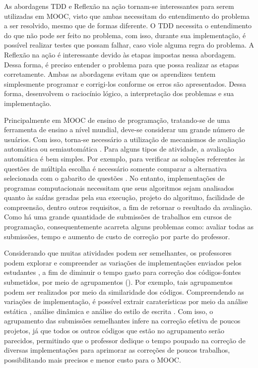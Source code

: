 	As abordagens \acl{TDD} e Reflexão na ação tornam-se interessantes para serem
	utilizadas em \acl{MOOC}, visto que ambas necessitam do entendimento do problema
	a ser resolvido, mesmo que de formas diferente. O \acl{TDD} necessita o entendimento
	do que não pode ser feito no problema, com isso, durante sua implementação, é
	possível realizar testes que possam falhar, caso viole alguma regra do problema.
	A Reflexão na ação é interessante devido às etapas impostas nessa abordagem.
	Dessa forma, é preciso entender o problema para que possa realizar as etapas
	corretamente. Ambas as abordagens evitam que os aprendizes tentem simplesmente
	programar e corrigi-los conforme os erros são apresentados. Dessa forma, desenvolvem
	o raciocínio lógico, a interpretação dos problemas e sua implementação.
	
	Principalmente em \acs{MOOC} de ensino de programação, tratando-se de uma ferramenta de
	ensino a nível mundial, deve-se considerar um grande número de usuários. Com isso,
	torna-se necessário a utilização de mecanismos de avaliação automática ou
	semiautomática \cite{schmidt2013producing}. Para alguns tipos de atividade, a
	avaliação automática é bem simples. Por exemplo, para verificar as soluções
	referentes às questões de múltipla escolha é necessário somente comparar a
	alternativa selecionada com o gabarito de questões \cite{alario2013analysing}. No
	entanto, implementações de programas computacionais necessitam que seus algoritmos
	sejam analisados quanto às saídas geradas pela sua execução, projeto do algoritmo,
	facilidade de compreensão, dentro outros requisitos, a fim de retornar o resultado
	da avaliação. Como há uma grande quantidade de submissões de trabalhos em cursos
	de programação, consequentemente acarreta alguns problemas como: avaliar todas as
	submissões, tempo e aumento de custo de correção por parte do professor.
	
	
	
	Considerando que muitas atividades podem ser semelhantes, os professores podem explorar
	e compreender as variações de implementações enviados pelos estudantes \cite{Yin:2015}, a fim de diminuir
	o tempo gasto para correção dos códigos-fontes submetidos, por meio de agrupamentos
	(). Por exemplo, tais agrupamentos podem ser realizados por meio
	da similaridade dos códigos. Compreendendo as variações de implementação, é possível
	extrair caraterísticas por meio da análise estática \cite{Yin:2015,Glassman:2014,Taherkhani:2012},
	análise dinâmica \cite{Glassman:2015} e análise do estilo de escrita \cite{Wei2015}.
	Com	isso, o agrupamento das submissões semelhantes infere na correção efetiva de
	poucos projetos, já que todos os outros códigos que estão no agrupamento serão
	parecidos, permitindo que o professor dedique o tempo poupado na correção de diversas
	implementações para aprimorar as correções de poucos trabalhos, possibilitando
	 mais precisos e menor custo para o \acs{MOOC}.
	
